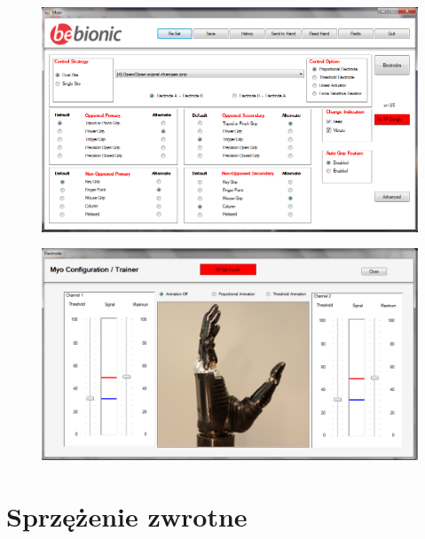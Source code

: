 \documentclass[8pt]{beamer}
\begin{document}
		\begin{frame}
		\begin{center}
			\begin{figure}
				\includegraphics[width=\textwidth]{graphics/bebelance.png}
				\label{graph:feedback}	
			\end{figure}
			\end{center}
		\end{frame}			
		
		\begin{frame}
		\begin{center}
			\begin{figure}
				\includegraphics[width=\textwidth]{graphics/bebelance2.png}
				\label{graph:feedback}	
			\end{figure}
			\end{center}
		\end{frame}		

\section{Sprzężenie zwrotne}
\end{document}
